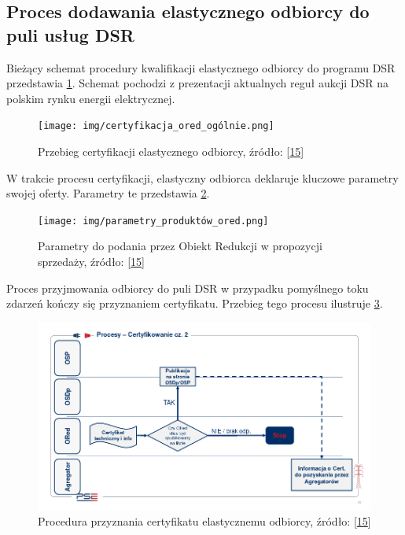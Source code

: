 \hypertarget{proces-dodawania-elastycznego-odbiorcy-do-puli-usux142ug-dsr}{%
\subsection{Proces dodawania elastycznego odbiorcy do puli usług
DSR}\label{proces-dodawania-elastycznego-odbiorcy-do-puli-usux142ug-dsr}}

Bieżący schemat procedury kwalifikacji elastycznego odbiorcy do programu
DSR przedstawia \cref{fig:certyfikacja}. Schemat pochodzi z prezentacji
aktualnych reguł aukcji DSR na polskim rynku energii elektrycznej.

\begin{figure}
\hypertarget{fig:certyfikacja}{%
\centering
\texttt{[image: img/certyfikacja\_ored\_ogólnie.png]}
\caption{Przebieg certyfikacji elastycznego odbiorcy, źródło:
{[}\protect\hyperlink{ref-socha_dsr_2018}{15}{]}}\label{fig:certyfikacja}
}
\end{figure}

W trakcie procesu certyfikacji, elastyczny odbiorca deklaruje kluczowe
parametry swojej oferty. Parametry te przedstawia \cref{fig:parametry}.

\begin{figure}
\hypertarget{fig:parametry}{%
\centering
\texttt{[image: img/parametry\_produktów\_ored.png]}
\caption{Parametry do podania przez Obiekt Redukcji w propozycji
sprzedaży, źródło:
{[}\protect\hyperlink{ref-socha_dsr_2018}{15}{]}}\label{fig:parametry}
}
\end{figure}

Proces przyjmowania odbiorcy do puli DSR w przypadku pomyślnego toku
zdarzeń kończy się przyznaniem certyfikatu. Przebieg tego procesu
ilustruje \cref{fig:certyfikacja_2}.

\begin{figure}
\hypertarget{fig:certyfikacja_2}{%
\centering
\includegraphics{img/certyfikacja_ored.png}
\caption{Procedura przyznania certyfikatu elastycznemu odbiorcy, źródło:
{[}\protect\hyperlink{ref-socha_dsr_2018}{15}{]}}\label{fig:certyfikacja_2}
}
\end{figure}

